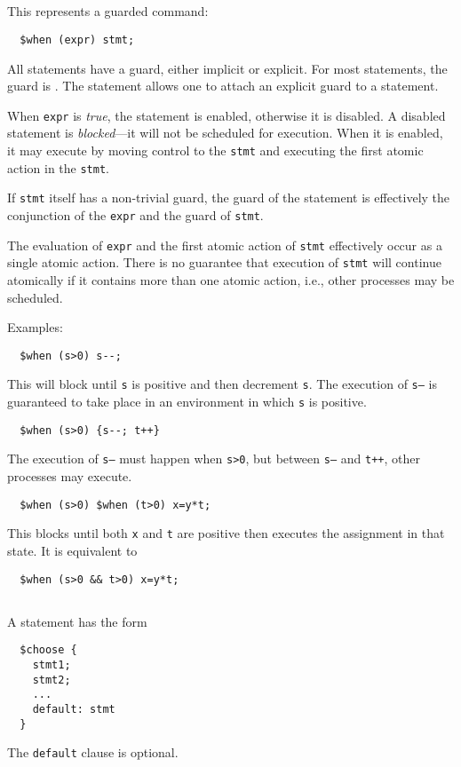 \documentclass[11pt]{book}
\begin{document}
\subsection{\cwhen} This represents a guarded command:
\begin{verbatim}
  $when (expr) stmt;
\end{verbatim}
All statements have a guard, either implicit or explicit.  For most
statements, the guard is \ctrue.  The \cwhen{} statement allows one to
attach an explicit guard to a statement.

When \texttt{expr} is \emph{true}, the statement is enabled, otherwise
it is disabled.  A disabled statement is \emph{blocked}---it will not
be scheduled for execution.  When it is enabled, it may execute by
moving control to the \texttt{stmt} and executing the first atomic
action in the \texttt{stmt}.

If \texttt{stmt} itself has a non-trivial guard, the guard of the
\cwhen{} statement is effectively the conjunction of the \texttt{expr}
and the guard of \texttt{stmt}.

The evaluation of \texttt{expr} and the first atomic action of
\texttt{stmt} effectively occur as a single atomic action.  There is
no guarantee that execution of \texttt{stmt} will continue atomically
if it contains more than one atomic action, i.e., other processes may
be scheduled.

Examples:
\begin{verbatim}
  $when (s>0) s--;
\end{verbatim}
This will block until \texttt{s} is positive and then decrement
\texttt{s}.  The execution of \texttt{s--} is guaranteed to take place
in an environment in which \texttt{s} is positive.

\begin{verbatim}
  $when (s>0) {s--; t++}
\end{verbatim}
The execution of \texttt{s--} must happen when \texttt{s>0}, but
between \texttt{s--} and \texttt{t++}, other processes may execute.

\begin{verbatim}
  $when (s>0) $when (t>0) x=y*t;
\end{verbatim}
This blocks until both \texttt{x} and \texttt{t} are positive then
executes the assignment in that state.  It is equivalent to
\begin{verbatim}
  $when (s>0 && t>0) x=y*t;
\end{verbatim}

\subsection{\cchoose}  A \cchoose{} statement has the form
\begin{verbatim}
  $choose {
    stmt1;
    stmt2;
    ...
    default: stmt
  }
\end{verbatim}
The \texttt{default} clause is optional.
\end{document}
